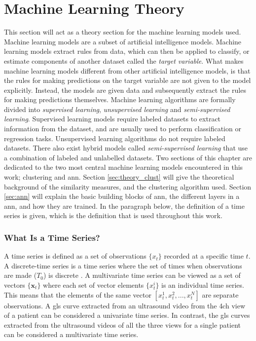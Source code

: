 \chapter{Machine Learning Theory} \label{chap:ml}

This section will act as a theory section for the machine learning models used. Machine learning models are a subset of artificial intelligence models. Machine learning models extract rules from data, which can then be applied to classify, or estimate components of another dataset called the \textit{target variable}. What makes machine learning models different from other artificial intelligence models, is that the rules for making predictions on the target variable are not given to the model explicitly. Instead, the models are given data and subsequently extract the rules for making predictions themselves. Machine learning algorithms are formally divided into \textit{supervised learning}, \textit{unsupervised learning} and \textit{semi-supervised learning}. Supervised learning models require labeled datasets to extract information from the dataset, and are usually used to perform classification or regression tasks. Unsupervised learning algorithms do not require labeled datasets. There also exist hybrid models called \textit{semi-supervised learning} that use a combination of labeled and unlabelled datasets. Two sections of this chapter are dedicated to the two most central machine learning models encountered in this work; clustering and \acrshort{ann}. Section \ref{sec:theory_clust} will give the theoretical background of the similarity measures, and the clustering algorithm used. Section \ref{sec:ann} will explain the basic building blocks of \acrshort{ann}, the different layers in a \acrshort{ann}, and how they are trained. In the paragraph below, the definition of a time series is given, which is the definition that is used throughout this work. \bigskip

\subsection*{What Is a Time Series?}
A time series is defined as a set of observations $\{x_t\}$ recorded at a specific time $t$. A discrete-time series is a time series where the set of times when observations are made ($T_0$) is discrete \cite{brockwell_davis_advanced}. A multivariate time series can be viewed as a set of vectors $\{\mathbf{x}_t\}$ where each set of vector elements $\{x^i_t\}$ is an individual time series. This means that the elements of the same vector $[x^1_t, x^2_t,...,x^N_t]$ are separate observations. A \acrshort{gls} curve extracted from an ultrasound video from the \acrshort{4ch} view of a patient can be considered a univariate time series. In contrast, the \acrshort{gls} curves extracted from the ultrasound videos of all the three views for a single patient can be considered a multivariate time series. \bigskip

